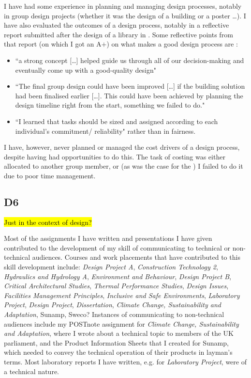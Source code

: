 I have had some experience in planning and managing design processes, notably in group design projects (whether it was the design of a building or a poster \ldots).
I have also evaluated the outcomes of a design process, notably in a reflective report submitted after the design of a library in \CASTitle.
Some reflective points from that report (on which I got an A$+$) on what makes a good design process are \citep{eklowCAS}:
\begin{itemize}
	\item ``a strong concept [\ldots] helped guide us through all of our decision-making and eventually come up with a good-quality design"
	\item ``The final group design could have been improved [\ldots] if the building solution had been finalised earlier [\ldots]. This could have been achieved by planning the design timeline right from the start, something we failed to do."
	\item ``I learned that tasks should be sized and assigned according to each individual’s commitment/ reliability" rather than in fairness.
\end{itemize}

I have, however, never planned or managed the cost drivers of a design process, despite having had opportunities to do this.
The task of costing was either allocated to another group member, or (as was the case for the \PRJTitle) I failed to do it due to poor time management.







\subsection*{D6}

\hl{Just in the context of design?}

Most of the assignments I have written and presentations I have given contributed to the development of my skill of communicating to technical or non-technical audiences.
Courses and work placements that have contributed to this skill development include:
\textit{Design Project A},
\textit{Construction Technology 2},
\textit{Hydraulics and Hydrology A},
\textit{Environment and Behaviour},
\textit{Design Project B},
\textit{Critical Architectural Studies},
\textit{Thermal Performance Studies},
\textit{Design Issues},
\textit{Facilities Management Principles},
\textit{Inclusive and Safe Environments},
\textit{Laboratory Project},
\textit{Design Project},
\textit{Dissertation},
\textit{Climate Change, Sustainability and Adaptation},
Sunamp,
Sweco?
Instances of communicating to non-technical audiences include my POSTnote assignment for \textit{Climate Change, Sustainability and Adaptation}, where I wrote about a technical topic to members of the UK parliament, and the Product Information Sheets that I created for Sunamp, which needed to convey the technical operation of their products in layman's terms.
Most laboratory reports I have written, e.g. for \textit{Laboratory Project}, were of a technical nature.



